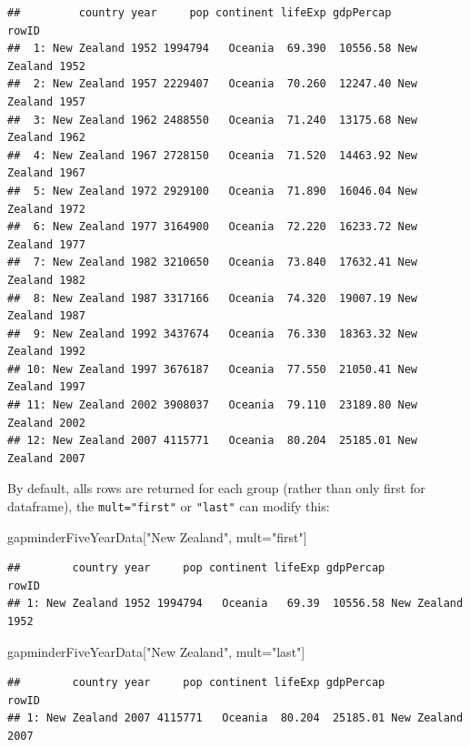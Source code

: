 \documentclass[]{article}
\newenvironment{Shaded}{\begin{snugshade}}{\end{snugshade}}
\newcommand{\StringTok}[1]{\textcolor[rgb]{0.31,0.60,0.02}{{#1}}}
\newcommand{\NormalTok}[1]{{#1}}
\begin{document}
\begin{verbatim}
##         country year     pop continent lifeExp gdpPercap            rowID
##  1: New Zealand 1952 1994794   Oceania  69.390  10556.58 New Zealand 1952
##  2: New Zealand 1957 2229407   Oceania  70.260  12247.40 New Zealand 1957
##  3: New Zealand 1962 2488550   Oceania  71.240  13175.68 New Zealand 1962
##  4: New Zealand 1967 2728150   Oceania  71.520  14463.92 New Zealand 1967
##  5: New Zealand 1972 2929100   Oceania  71.890  16046.04 New Zealand 1972
##  6: New Zealand 1977 3164900   Oceania  72.220  16233.72 New Zealand 1977
##  7: New Zealand 1982 3210650   Oceania  73.840  17632.41 New Zealand 1982
##  8: New Zealand 1987 3317166   Oceania  74.320  19007.19 New Zealand 1987
##  9: New Zealand 1992 3437674   Oceania  76.330  18363.32 New Zealand 1992
## 10: New Zealand 1997 3676187   Oceania  77.550  21050.41 New Zealand 1997
## 11: New Zealand 2002 3908037   Oceania  79.110  23189.80 New Zealand 2002
## 12: New Zealand 2007 4115771   Oceania  80.204  25185.01 New Zealand 2007
\end{verbatim}

By default, alls rows are returned for each group (rather than only
first for dataframe), the \texttt{mult="first"} or \texttt{"last"} can
modify this:

\begin{Shaded}
\begin{Highlighting}[]
\NormalTok{gapminderFiveYearData[}\StringTok{"New Zealand"}\NormalTok{, mult=}\StringTok{"first"}\NormalTok{] }
\end{Highlighting}
\end{Shaded}

\begin{verbatim}
##        country year     pop continent lifeExp gdpPercap            rowID
## 1: New Zealand 1952 1994794   Oceania   69.39  10556.58 New Zealand 1952
\end{verbatim}

\begin{Shaded}
\begin{Highlighting}[]
\NormalTok{gapminderFiveYearData[}\StringTok{"New Zealand"}\NormalTok{, mult=}\StringTok{"last"}\NormalTok{] }
\end{Highlighting}
\end{Shaded}

\begin{verbatim}
##        country year     pop continent lifeExp gdpPercap            rowID
## 1: New Zealand 2007 4115771   Oceania  80.204  25185.01 New Zealand 2007
\end{verbatim}
\end{document}
